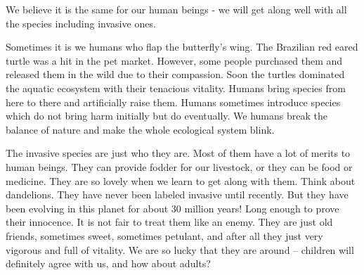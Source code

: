 \documentclass[12pt]{article}
\begin{document}
We believe it is the same for our human beings - we will get along well with all the species including invasive ones.

Sometimes it is we humans who flap the butterfly's wing.  The Brazilian red eared turtle was a hit in the pet market. However, some people purchased them and released them in the wild due to their compassion. Soon the turtles dominated the aquatic ecosystem with their tenacious vitality.  Humans bring species from here to there and artificially raise them.  Humans sometimes introduce species which do not bring harm initially but do eventually.  We humans break the balance of nature and make the whole ecological system blink.

The invasive species are just who they are.  Most of them have a lot of merits to human beings.  They can provide fodder for our livestock, or they can be food or medicine.  They are so lovely when we learn to get along with them.  Think about dandelions.  They have never been labeled invasive until recently.  But they have been evolving in this planet for about 30 million years! Long enough to prove their innocence.  It is not fair to treat them like an enemy.  They are just old friends, sometimes sweet, sometimes petulant, and after all they just very vigorous and full of vitality.  We are so lucky that they are around -- children will definitely agree with us, and how about adults?

\newpage

\begin{spacing}{0.9}
{}
\newrefcontext
\printbibliography
\end{spacing}
	
\end{document}
